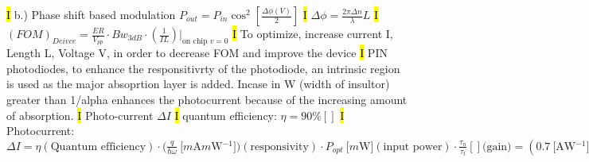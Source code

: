 \documentclass[fontsize=3]{scrartcl}
\begin{document}
\hl{I}
b.) Phase shift based modulation
$P_{out} = P_{in}\cos^2 [\frac{\Delta \phi (V)}{2}]$
\hl{I}
$\Delta \phi = \frac{2\pi \Delta n}{\lambda}L$
\hl{I}
$(FOM)_{Deivce} = \frac{ER}{V_{pp}} \cdot Bw_{3dB} \cdot (\frac{1}{IL})|_{\text{on chip }v = 0}$
\hl{I}
To optimize, increase current I, Length L, Voltage V, in order to decrease FOM and improve the device 
\hl{I}
PIN photodiodes, to enhance the responsitivrty of the photodiode, an intrinsic region is used as the major absoprtion layer is added. Incase in W (width of insultor) greater than 1/alpha  enhances the photocurrent because of the increasing amount of absorption. 
\hl{I}
Photo-current $\Delta I$
\hl{I}
quantum efficiency: $\eta = 90\%[]$
\hl{I}
Photocurrent: $\Delta I = \eta (\text{Quantum efficiency}) \cdot (\frac{q}{\hbar \omega} \SI{}{[ m\ampere m\watt^{-1} ] ) (\text{responsivity})} \cdot P_{opt} \SI{}{[ m\watt ]} (\text{input power}) \cdot \frac{\tau_n}{\tau_t}[] \text{(gain)} =(\SI{0.7}{[\ampere \watt^{-1}]})(\SI{5e-3}{[\watt]})(1.0)(0.9) = \SI{3.15e-3}{\ampere}$
















\end{document}
